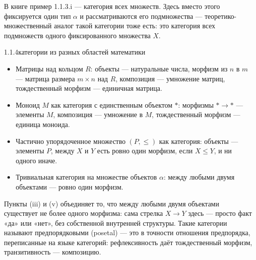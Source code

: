 \begin{remark}
В книге пример 1.1.3.i — категория всех множеств. Здесь вместо этого фиксируется один
тип $\alpha$ и рассматриваются его подмножества — теоретико-множественный аналог такой
категории тоже есть: это категория всех подмножеств одного фиксированного множества
$X$.
\end{remark}

\begin{example}{1.1.4}{категории из разных областей математики}
\begin{itemize}
  \item[(i)] Матрицы над кольцом $R$: объекты — натуральные числа, морфизм из $n$ в
        $m$ — матрица размера $m \times n$ над $R$, композиция — умножение матриц,
        тождественный морфизм — единичная матрица.
  \item[(ii)] Моноид $M$ как категория с единственным объектом $*$: морфизмы $* \to *$
        — элементы $M$, композиция — умножение в $M$, тождественный морфизм — единица
        моноида.
  \item[(iii)] Частично упорядоченное множество $(P, \le)$ как категория: объекты —
        элементы $P$, между $X$ и $Y$ есть ровно один морфизм, если $X \le Y$, и ни
        одного иначе.
  \item[(v)] Тривиальная категория на множестве объектов $\alpha$: между любыми двумя
        объектами — ровно один морфизм.
\end{itemize}
\end{example}

\begin{intuition}
Пункты (iii) и (v) объединяет то, что между любыми двумя объектами существует не более
одного морфизма: сама стрелка $X \to Y$ здесь — просто факт «да» или «нет», без
собственной внутренней структуры. Такие категории называют предпорядковыми (posetal) — это в точности отношения предпорядка, переписанные на языке категорий:
рефлексивность даёт тождественный морфизм, транзитивность — композицию.

\begin{center}
\end{center}
\end{intuition}

